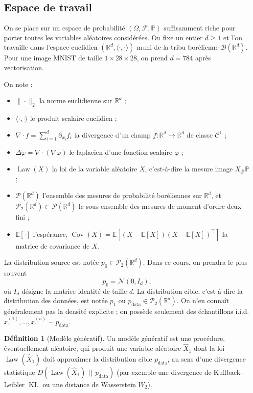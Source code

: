 \documentclass[11pt,a4paper]{article}
\theoremstyle{definition}
\newtheorem{definition}{Définition}[section]
\theoremstyle{plain}
\theoremstyle{remark}
\newcommand{\R}{\mathbb{R}}
\newcommand{\E}{\mathbb{E}}
\newcommand{\Prob}{\mathbb{P}}
\DeclareMathOperator{\Cov}{Cov}
\DeclareMathOperator{\Law}{Law}
\DeclareMathOperator{\KL}{KL}
\begin{document}
\subsection{Espace de travail}

On se place sur un espace de probabilité $(\Omega,\mathcal{F},\Prob)$ suffisamment
riche pour porter toutes les variables aléatoires considérées. On fixe un entier
$d\geq 1$ et l'on travaille dans l'espace euclidien $(\R^d,\langle\cdot,\cdot\rangle)$
muni de la tribu borélienne $\mathcal{B}(\R^d)$. Pour une image MNIST de taille
$1\times 28\times 28$, on prend $d=784$ après vectorisation.

On note :
\begin{itemize}[leftmargin=*]
  \item $\|\cdot\|_2$ la norme euclidienne sur $\R^d$ ;
  \item $\langle \cdot,\cdot\rangle$ le produit scalaire euclidien ;
  \item $\nabla\cdot f=\sum_{i=1}^d \partial_{x_i}f_i$ la divergence d'un champ
  $f:\R^d\to\R^d$ de classe $\mathcal{C}^1$ ;
  \item $\Delta \varphi = \nabla\cdot(\nabla\varphi)$ le laplacien d'une
  fonction scalaire $\varphi$ ;
  \item $\Law(X)$ la loi de la variable aléatoire $X$, c'est-à-dire la mesure
  image $X_\#\Prob$ ;
  \item $\mathcal{P}(\R^d)$ l'ensemble des mesures de probabilité boréliennes
  sur $\R^d$, et $\mathcal{P}_2(\R^d)\subset\mathcal{P}(\R^d)$ le sous-ensemble
  des mesures de moment d'ordre deux fini ;
  \item $\E[\cdot]$ l'espérance, $\Cov(X)=\E[(X-\E[X])(X-\E[X])^\top]$ la matrice
  de covariance de $X$.
\end{itemize}

La distribution source est notée $p_0\in\mathcal{P}_2(\R^d)$. Dans ce cours, on
prendra le plus souvent
\[
  p_0 = \mathcal{N}(0,I_d),
\]
où $I_d$ désigne la matrice identité de taille $d$. La distribution cible,
c'est-à-dire la distribution des données, est notée $p_1$ ou
$p_{\mathrm{data}}\in\mathcal{P}_2(\R^d)$. On n'en connaît généralement pas la
densité explicite ; on possède seulement des échantillons i.i.d.
$x_1^{(1)},\dots,x_1^{(n)}\sim p_{\mathrm{data}}$.

\begin{definition}[Modèle génératif]
Un modèle génératif est une procédure, éventuellement aléatoire, qui produit une
variable aléatoire $\widehat{X}_1$ dont la loi $\Law(\widehat{X}_1)$ doit
approximer la distribution cible $p_{\mathrm{data}}$, au sens d'une divergence
statistique $D(\Law(\widehat{X}_1)\,\|\,p_{\mathrm{data}})$ (par exemple une
divergence de Kullback--Leibler $\KL$ ou une distance de Wasserstein $W_2$).
\end{definition}
\end{document}
